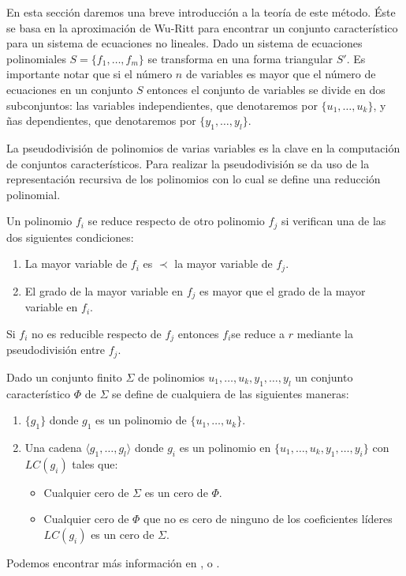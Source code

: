 En esta sección daremos una breve introducción a la teoría de este método. Éste se basa en la aproximación de Wu-Ritt para encontrar un conjunto característico para un sistema de ecuaciones no lineales. Dado un sistema de ecuaciones polinomiales $S = \{ f_1, \dotso, f_m \}$ se transforma en una forma triangular $S'$. Es importante notar que si el número $n$ de variables es mayor que el número de ecuaciones en un conjunto $S$ entonces el conjunto de variables se divide en dos subconjuntos: las variables independientes, que denotaremos por $\{ u_1, \dotso, u_k \}$, y ñas dependientes, que denotaremos por $\{ y_1, \dotso, y_l \}$.
\par La pseudodivisión de polinomios de varias variables es la clave en la computación de conjuntos característicos. Para realizar la pseudodivisión se da uso de la representación recursiva de los polinomios con lo cual se define una reducción polinomial.
\par Un polinomio $f_i$ se reduce respecto de otro polinomio $f_j$ si verifican una de las dos siguientes condiciones:

\begin{enumerate}
	\item La mayor variable de $f_i$ es $\prec$ la mayor variable de $f_j$.
	\item El grado de la mayor variable en $f_j$ es mayor que el grado de la mayor variable en $f_i$.
\end{enumerate} 

Si $f_i$ no es reducible respecto de $f_j$ entonces $f_i$se reduce a $r$ mediante la pseudodivisión entre $f_j$.

\begin{definition}
	Dado un conjunto finito $\Sigma$ de polinomios $u_1, \dotso, u_k, y_1, \dotso, y_l$ un conjunto característico $\Phi$ de $\Sigma$ se define de cualquiera de las siguientes maneras:
	\begin{enumerate}
		\item $\{ g_1 \}$ donde $g_1$ es un polinomio de $\{ u_1, \dotso, u_k \}$.
		\item Una cadena $\langle g_1, \dotso, g_l \rangle$ donde $g_i$ es un polinomio en $\{ u_1, \dotso, u_k, y_1, \dotso, y_i \}$ con $LC(g_i)$ tales que:
		\begin{itemize}
			\item Cualquier cero de $\Sigma$ es un cero de $\Phi$.
			\item Cualquier cero de $\Phi$ que no es cero de ninguno de los coeficientes líderes $LC(g_i)$ es un cero de $\Sigma$.
		\end{itemize}
	\end{enumerate}
\end{definition}

Podemos encontrar más información en \cite{Berchtold00}, \cite{Gallo91} o \cite{Gallo95}.